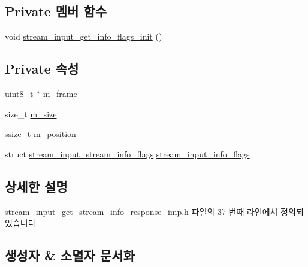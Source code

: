 \subsection*{Private 멤버 함수}
\begin{DoxyCompactItemize}
\item 
void \hyperlink{classavdecc__lib_1_1stream__input__get__stream__info__response__imp_a1bb3de0d949222dc7d11d16b62b41ae4}{stream\+\_\+input\+\_\+get\+\_\+info\+\_\+flags\+\_\+init} ()
\end{DoxyCompactItemize}
\subsection*{Private 속성}
\begin{DoxyCompactItemize}
\item 
\hyperlink{stdint_8h_aba7bc1797add20fe3efdf37ced1182c5}{uint8\+\_\+t} $\ast$ \hyperlink{classavdecc__lib_1_1stream__input__get__stream__info__response__imp_a50417969cf438e7c8d698726bbbe2ff9}{m\+\_\+frame}
\item 
size\+\_\+t \hyperlink{classavdecc__lib_1_1stream__input__get__stream__info__response__imp_a0dc3c363255f193681c77b4d2a82e995}{m\+\_\+size}
\item 
ssize\+\_\+t \hyperlink{classavdecc__lib_1_1stream__input__get__stream__info__response__imp_af5e691c4a8a0feb07f48440b321206cd}{m\+\_\+position}
\item 
struct \hyperlink{structavdecc__lib_1_1stream__input__get__stream__info__response__imp_1_1stream__input__stream__info__flags}{stream\+\_\+input\+\_\+stream\+\_\+info\+\_\+flags} \hyperlink{classavdecc__lib_1_1stream__input__get__stream__info__response__imp_a7850eefaf805546923263be01f1a2ec3}{stream\+\_\+input\+\_\+info\+\_\+flags}
\end{DoxyCompactItemize}


\subsection{상세한 설명}


stream\+\_\+input\+\_\+get\+\_\+stream\+\_\+info\+\_\+response\+\_\+imp.\+h 파일의 37 번째 라인에서 정의되었습니다.



\subsection{생성자 \& 소멸자 문서화}
